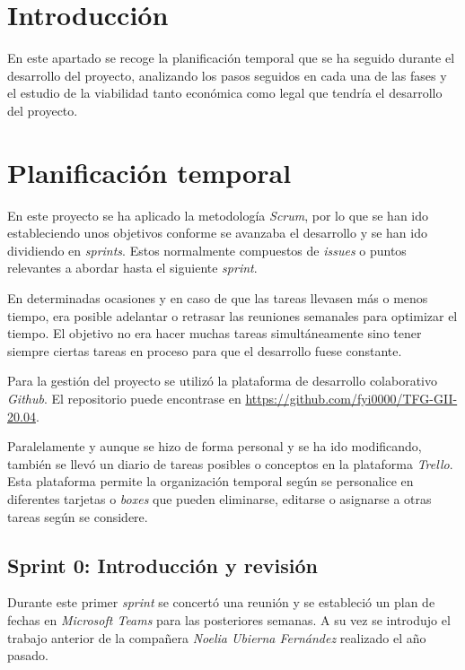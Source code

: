
\section{Introducción}

En este apartado se recoge la planificación temporal que se ha seguido durante el desarrollo del proyecto, analizando los pasos seguidos en cada una de las fases y el estudio de la viabilidad tanto económica como legal que tendría el desarrollo del proyecto. 

\section{Planificación temporal}

En este proyecto se ha aplicado la metodología \emph{Scrum}, por lo que se han ido estableciendo unos objetivos conforme se avanzaba el desarrollo y se han ido dividiendo en \emph{sprints}. Estos normalmente compuestos de \emph{issues} o puntos relevantes a abordar hasta el siguiente \emph{sprint}.

En determinadas ocasiones y en caso de que las tareas llevasen más o menos tiempo, era posible adelantar o retrasar las reuniones semanales para optimizar el tiempo. El objetivo no era hacer muchas tareas simultáneamente sino tener siempre ciertas tareas en proceso para que el desarrollo fuese constante.

Para la gestión del proyecto se utilizó la plataforma de desarrollo colaborativo \emph{Github}. El repositorio puede encontrase en \url{https://github.com/fyi0000/TFG-GII-20.04}. 

Paralelamente y aunque se hizo de forma personal y se ha ido modificando, también se llevó un diario de tareas posibles o conceptos en la plataforma \emph{Trello}. Esta plataforma permite la organización temporal según se personalice en diferentes tarjetas o \emph{boxes} que pueden eliminarse, editarse o asignarse a otras tareas según se considere. 

\subsection{Sprint 0: Introducción y revisión}
Durante este primer \emph{sprint} se concertó una reunión y se estableció un plan de fechas en \emph{Microsoft Teams} para las posteriores semanas. A su vez se introdujo el trabajo anterior de la compañera \emph{Noelia Ubierna Fernández} realizado el año pasado.

